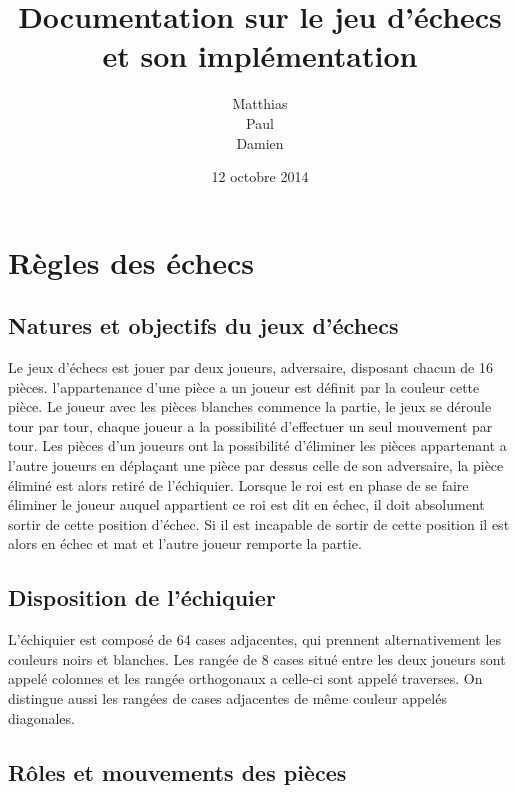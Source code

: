 \documentclass[12pt]{article}
\title{Documentation sur le jeu d'échecs et son implémentation}
\author{Matthias \bsc{Druelle}\\ Paul \bsc{Boutes}\\ Damien \bsc{Cassan}}
\date{12 octobre 2014}
\begin{document}
\maketitle

\clearpage

\tableofcontents

\clearpage

\section{Règles des échecs}\label{ruxe8gles-des-uxe9checs}

\subsection{Natures et objectifs du jeux
d'échecs}\label{natures-et-objectifs-du-jeux-duxe9checs}

Le jeux d'échecs est jouer par deux joueurs, adversaire, disposant
chacun de 16 pièces. l'appartenance d'une pièce a un joueur est définit
par la couleur cette pièce. Le joueur avec les pièces blanches commence
la partie, le jeux se déroule tour par tour, chaque joueur a la
possibilité d'effectuer un seul mouvement par tour. Les pièces d'un
joueurs ont la possibilité d'éliminer les pièces appartenant a l'autre
joueurs en déplaçant une pièce par dessus celle de son adversaire, la
pièce éliminé est alors retiré de l'échiquier. Lorsque le roi est en
phase de se faire éliminer le joueur auquel appartient ce roi est dit en
échec, il doit absolument sortir de cette position d'échec. Si il est
incapable de sortir de cette position il est alors en échec et mat et
l'autre joueur remporte la partie.

\subsection{Disposition de
l'échiquier}\label{disposition-de-luxe9chiquier}

L'échiquier est composé de 64 cases adjacentes, qui prennent
alternativement les couleurs noirs et blanches. Les rangée de 8 cases
situé entre les deux joueurs sont appelé colonnes et les rangée
orthogonaux a celle-ci sont appelé traverses. On distingue aussi les
rangées de cases adjacentes de même couleur appelés diagonales.

\subsection{Rôles et mouvements des
pièces}\label{ruxf4les-et-mouvements-des-piuxe8ces}
\end{document}
